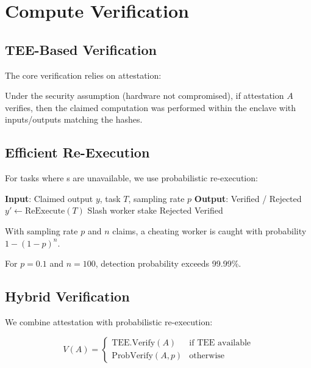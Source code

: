 \section{Compute Verification}

\label{sec:verification}

\subsection{TEE-Based Verification}

The core verification relies on \TEE{} attestation:

\begin{theorem}
Under the \TEE{} security assumption (hardware not compromised), if attestation $A$ verifies, then the claimed computation was performed within the enclave with inputs/outputs matching the hashes.
\end{theorem}

\subsection{Efficient Re-Execution}

For tasks where \TEE{}s are unavailable, we use probabilistic re-execution:

\begin{algorithm}[t]
\caption{Probabilistic Verification}
\label{alg:prob-verify}
\begin{algorithmic}[1]
\STATE \textbf{Input}: Claimed output $y$, task $T$, sampling rate $p$
\STATE \textbf{Output}: Verified / Rejected
    \STATE $y' \leftarrow \text{ReExecute}(T)$
        \STATE Slash worker stake
        \RETURN Rejected
    \ENDIF
\ENDIF
\RETURN Verified
\end{algorithmic}
\end{algorithm}

\begin{theorem}
With sampling rate $p$ and $n$ claims, a cheating worker is caught with probability $1 - (1-p)^n$.
\end{theorem}

For $p = 0.1$ and $n = 100$, detection probability exceeds 99.99\%.

\subsection{Hybrid Verification}

We combine \TEE{} attestation with probabilistic re-execution:

\begin{equation}
V(A) = \begin{cases}
\text{TEE.Verify}(A) & \text{if TEE available} \\
\text{ProbVerify}(A, p) & \text{otherwise}
\end{cases}
\end{equation}

